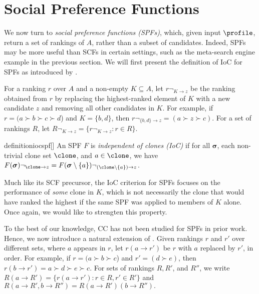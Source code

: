 \section{Social Preference Functions}\label{sec:spf}

We now turn to \emph{social preference functions (SPFs)}, which, given input $\profile$, return a set of rankings of $A$, rather than a subset of candidates. Indeed, SPFs may be more useful than SCFs in certain settings, such as the meta-search engine example in the previous section. We will first present the definition of IoC for SPFs as introduced by \citet{Freeman14:Axiomatic}.

For a ranking $r$ over $A$ and a non-empty $K\subseteq A$, let $r\neg_{K\to z}$ be the ranking obtained from $r$ by replacing the highest-ranked element of $K$ with a new candidate $z$ and removing all other candidates in $K$.
 For example, if $r= (a\succ b\succ c\succ d$) and $K=\{b,d\}$, then $r \neg_{\{b,d\}\to z} = (a \succ  z \succ c)$. For a set of rankings $R$, let $R\neg_{K\to z} = \{r \neg_{K\to z}: r \in R\}$. 

\begin{restatable}{definition}{iocspf}[{\citealt[Def. 4]{Freeman14:Axiomatic}]\label{def:ioc_spf}}
An SPF $F$ is \emph{independent of clones (IoC)} if for all $\boldsymbol{\sigma}$, each non-trivial clone set $\clone$, and $a \in \clone$, we have $F(\boldsymbol{\sigma}) \neg_{\clone \to z}= F(\boldsymbol{\sigma} \setminus \{a\}) \neg_{(\clone \setminus \{a\})\to z}$.
\end{restatable}

Much like its SCF precursor, the IoC criterion for SPFs focuses on the performance of \emph{some} clone in $K$, which is not necessarily the clone that would have ranked the highest if the same SPF was applied to members of $K$ alone. Once again, we would like to strengten this property.

To the best of our knowledge, CC has not been studied for SPFs in prior work. Hence, we now introduce a natural extension of . Given rankings $r$ and $r'$ over different sets, where $a$ appears in $r$, let $r(a \rightarrow r')$ be $r$ with $a$ replaced by $r'$, in order. For example, if $r= (a\succ b\succ c$) and  $r'= (d\succ e)$, then $r(b \rightarrow r')= a\succ d\succ e\succ  c$. For sets of rankings $R, R'$, and $R''$, we write $R(a\rightarrow R')= \{r(a\rightarrow r'): r \in R, r'\in R'\}$ and $R(a\rightarrow R', b\rightarrow R'')=R(a\rightarrow R')(b \rightarrow R'').$

